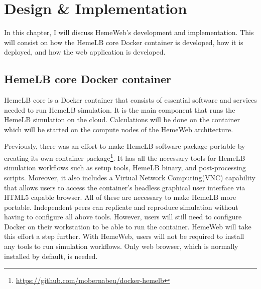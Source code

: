 

\chapter[Design \& Implementation]{Design \& Implementation}

In this chapter, I will discuss HemeWeb's development and implementation. This will consist on how the HemeLB core Docker container is developed, how it is deployed, and how the web application is developed.


\section{HemeLB core Docker container}

HemeLB core is a Docker container that consists of essential software and services needed to run HemeLB simulation. It is the main component that runs the HemeLB simulation on the cloud. Calculations will be done on the container which will be started on the compute nodes of the HemeWeb architecture. 

Previously, there was an effort to make HemeLB software package portable by creating its own container package\footnote{\url{https://github.com/mobernabeu/docker-hemelb}}. It has all the necessary tools for HemeLB simulation workflows such as setup tools, HemeLB binary, and post-processing scripts. Moreover, it also includes a Virtual Network Computing(VNC) capability that allows users to access the container's headless graphical user interface via HTML5 capable browser. All of these are necessary to make HemeLB more portable. Independent peers can replicate and reproduce simulation without having to configure all above tools. However, users will still need to configure Docker on their workstation to be able to run the container. HemeWeb will take this effort a step further. With HemeWeb, users will not be required to install any tools to run simulation workflows. Only web browser, which is normally installed by default, is needed.


